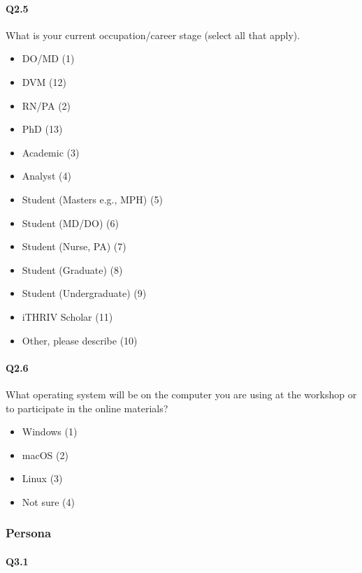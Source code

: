 \documentclass[030-workshop.tex]{subfiles}
\begin{document}
\paragraph{Q2.5}

    What is your current occupation/career stage (select all that apply).

    \begin{itemize}
        \item DO/MD  (1)
        \item DVM  (12)
        \item RN/PA  (2)
        \item PhD  (13)
        \item Academic  (3)
        \item Analyst  (4)
        \item Student (Masters e.g., MPH)  (5)
        \item Student (MD/DO)  (6)
        \item Student (Nurse, PA)  (7)
        \item Student (Graduate)  (8)
        \item Student (Undergraduate)  (9)
        \item iTHRIV Scholar  (11)
        \item Other, please describe  (10)
    \end{itemize}

\paragraph{Q2.6}

     What operating system will be on the computer you are using at the workshop or to participate in the online materials?

    \begin{itemize}
        \item Windows  (1)
        \item macOS  (2)
        \item Linux  (3)
        \item Not sure  (4)
    \end{itemize}

\subsubsection{Persona}

\paragraph{Q3.1}
\end{document}
